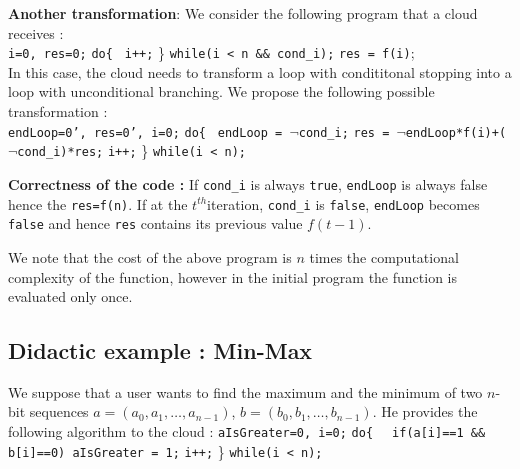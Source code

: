 \documentclass{acm_proc_article-sp}
\begin{document}
\textbf{Another transformation}: We consider the following program that a cloud receives : \\
 \phantom{x} \texttt{i=0, res=0;}
\newline \phantom{x} \texttt{do\{ }
\newline \phantom{x} \hspace{9ex} \texttt{i++;} 
\newline   \phantom{x} \} \texttt{while(i < n \&\& cond\_i);} 
\newline  \phantom{x} \texttt{res = f(i)};\\
In this case, the cloud needs to transform a loop with condititonal stopping into a loop with unconditional branching. We propose the following possible transformation : \\
 \phantom{x} \texttt{endLoop=0', res=0', i=0;}
\newline \phantom{x} \texttt{do\{ }
\newline \phantom{x} \hspace{6ex} \texttt{endLoop = $\neg$cond\_i;}
\newline \phantom{x} \hspace{6ex} \texttt{res = $\neg$endLoop*f(i)+($\neg$cond\_i)*res;}
\newline \phantom{x} \hspace{6ex} \texttt{i++;} 
\newline   \phantom{x} \} \texttt{while(i < n);} 

\textbf{Correctness of the code :} If \texttt{cond\_i} is always \texttt{true}, \texttt{endLoop} is always false hence the \texttt{res=f(n)}. If at the $t^{th}$iteration, \texttt{cond\_i} is \texttt{false}, \texttt{endLoop} becomes \texttt{false} and hence \texttt{res} contains its previous value $f(t-1)$. 

We note that the cost of the above program is $n$ times the computational complexity of the function, however in the initial program the function is evaluated only once.

\subsection{ Didactic example :  Min-Max}
\label{sec:ex}

We suppose that a user wants to find the maximum and the minimum of two $n$-bit sequences $a = (a_0,a_1,\ldots, a_{n-1})$, $b=(b_0,b_1,\ldots, b_{n-1})$. He provides the following algorithm to the cloud :
\newline \phantom{x} \texttt{aIsGreater=0, i=0;}
\newline \phantom{x} \texttt{do\{ }
\newline \phantom{x} \hspace{6ex} \texttt{ if(a[i]==1 \&\& b[i]==0) 
\newline \phantom{x} \hspace{14ex}aIsGreater = 1;}
\newline \phantom{x} \hspace{7ex} \texttt{i++;} 
\newline   \phantom{x} \} \texttt{while(i < n);} 
\end{document}
